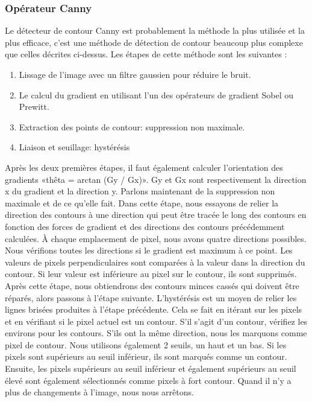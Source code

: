 \documentclass[12pt, openany]{report}
\begin{document}
\subsubsection{Opérateur Canny}
Le détecteur de contour Canny est probablement la méthode la plus utilisée et la plus efficace, c'est une méthode de détection de contour beaucoup plus complexe que celles décrites ci-dessus.
\noindent Les étapes de cette méthode sont les suivantes :
\begin{enumerate}
    \item Lissage de l'image avec un filtre gaussien pour réduire le bruit.
    \item Le calcul du gradient en utilisant l'un des opérateurs de gradient Sobel ou Prewitt.
    \item Extraction des points de contour: suppression non maximale.
    \item Liaison et seuillage: hystérésis
\end{enumerate}

Après les deux premières étapes, il faut également calculer l'orientation des gradients «thêta = arctan (Gy / Gx)». Gy et Gx sont respectivement la direction x du gradient et la direction y.
Parlons maintenant de la suppression non maximale et de ce qu'elle fait. Dans cette étape, nous essayons de relier la direction des contours à une direction qui peut être tracée le long des contours en fonction des forces de gradient et des directions des contours précédemment calculées. À chaque emplacement de pixel, nous avons quatre directions possibles. Nous vérifions toutes les directions si le gradient est maximum à ce point. Les valeurs de pixels perpendiculaires sont comparées à la valeur dans la direction du contour. Si leur valeur est inférieure au pixel sur le contour, ils sont supprimés. Après cette étape, nous obtiendrons des contours minces cassés qui doivent être réparés, alors passons à l'étape suivante.
L'hystérésis est un moyen de relier les lignes brisées produites à l'étape précédente. Cela se fait en itérant sur les pixels et en vérifiant si le pixel actuel est un contour. S'il s'agit d'un contour, vérifiez les environs pour les contours. S'ils ont la même direction, nous les marquons comme pixel de contour. Nous utilisons également 2 seuils, un haut et un bas. Si les pixels sont supérieurs au seuil inférieur, ils sont marqués comme un contour. Ensuite, les pixels supérieurs au seuil inférieur et également supérieurs au seuil élevé sont également sélectionnés comme pixels à fort contour. Quand il n'y a plus de changements à l'image, nous nous arrêtons.
\end{document}

